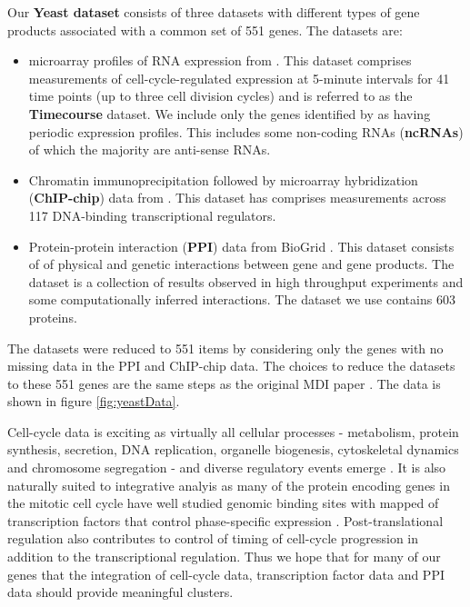 \documentclass[]{article}
\begin{document}
Our \textbf{Yeast dataset} consists of three datasets with different types of gene products associated with a common set of 551 genes. The datasets are:
\begin{itemize}
	\item microarray profiles of RNA expression from \cite{granovskaia2010high}. This dataset comprises measurements of cell-cycle-regulated expression at 5-minute intervals for 41 time points (up to three cell division cycles) and is referred to as the \textbf{Timecourse} dataset. We include only the genes identified by \cite{granovskaia2010high} as having periodic expression profiles. This includes some non-coding RNAs (\textbf{ncRNAs}) of which the majority are anti-sense RNAs.
	\item Chromatin immunoprecipitation followed by microarray hybridization (\textbf{ChIP-chip}) data from \cite{harbison2004transcriptional}. This dataset has comprises measurements across 117 DNA-binding transcriptional regulators.
	\item Protein-protein interaction (\textbf{PPI}) data from BioGrid \citep{stark2006biogrid}. This dataset consists of of physical and genetic interactions between gene and gene products. The dataset is a collection of results observed in high throughput experiments and some computationally inferred interactions. The dataset we use contains 603 proteins.
\end{itemize}
The datasets were reduced to 551 items by considering only the genes with no missing data in the PPI and ChIP-chip data. The choices to reduce the datasets to these 551 genes are the same steps as the original MDI paper \citep{kirk2012bayesian}. The data is shown in figure \ref{fig:yeastData}.

Cell-cycle data is exciting as virtually all cellular processes - metabolism, protein synthesis, secretion, DNA replication, organelle biogenesis, cytoskeletal dynamics and chromosome segregation - and diverse regulatory events emerge \citep{granovskaia2010high}. It is also naturally suited to integrative analyis as many of the protein encoding genes in the mitotic cell cycle have well studied genomic binding sites with mapped of transcription factors that control phase-specific expression \citep{cho1998genome, spellman1998comprehensive}. Post-translational regulation also contributes to control of timing of cell-cycle progression in addition to the transcriptional regulation. Thus we hope that for many of our genes that the integration of cell-cycle data, transcription factor data and PPI data should provide meaningful clusters.
\end{document}
